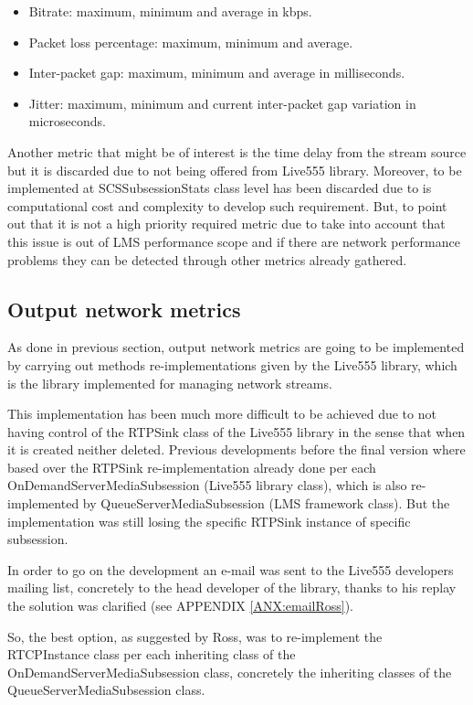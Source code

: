 \begin{itemize}
\item Bitrate: maximum, minimum and average in kbps.
\item Packet loss percentage: maximum, minimum and average.
\item Inter-packet gap: maximum, minimum and average in milliseconds.
\item Jitter: maximum, minimum and current inter-packet gap variation in microseconds.
\end{itemize}

Another metric that might be of interest is the time delay from the stream source but it is discarded due to not being offered from Live555 library. Moreover, to be implemented at SCSSubsessionStats class level has been discarded due to is computational cost and complexity to develop such requirement. But, to point out that it is not a high priority required metric due to take into account that this issue is out of LMS performance scope and if there are network performance problems they can be detected through other metrics already gathered.


\subsection{Output network metrics}

As done in previous section, output network metrics are going to be implemented by carrying out methods re-implementations given by the Live555 library, which is the library implemented for managing network streams.

This implementation has been much more difficult to be achieved due to not having control of the RTPSink class of the Live555 library in the sense that when it is created neither deleted. Previous developments before the final version where based over the RTPSink re-implementation already done per each OnDemandServerMediaSubsession (Live555 library class), which is also re-implemented by QueueServerMediaSubsession (LMS framework class). But the implementation was still losing the specific RTPSink instance of specific subsession.

In order to go on the development an e-mail was sent to the Live555 developers mailing list, concretely to the head developer of the library, thanks to his replay the solution was clarified (see APPENDIX \ref{ANX:emailRoss}).

So, the best option, as suggested by Ross, was to re-implement the RTCPInstance class per each inheriting class of the OnDemandServerMediaSubsession class, concretely the inheriting classes of the QueueServerMediaSubsession class. 

